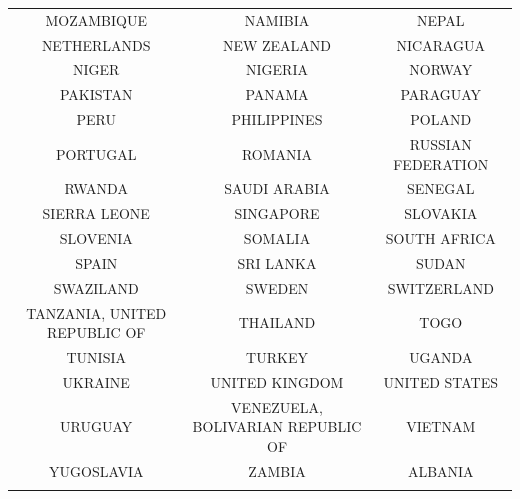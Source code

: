 \documentclass[12pt,a4paper]{article}\usepackage[]{graphicx}\usepackage[]{color}
\begin{document}
{\begin{table}[!htbp]
\begin{tabular}{@{\extracolsep{5pt}} ccc}
MOZAMBIQUE & NAMIBIA & NEPAL \\ 
NETHERLANDS & NEW ZEALAND & NICARAGUA \\ 
NIGER & NIGERIA & NORWAY \\ 
PAKISTAN & PANAMA & PARAGUAY \\ 
PERU & PHILIPPINES & POLAND \\ 
PORTUGAL & ROMANIA & RUSSIAN FEDERATION \\ 
RWANDA & SAUDI ARABIA & SENEGAL \\ 
SIERRA LEONE & SINGAPORE & SLOVAKIA \\ 
SLOVENIA & SOMALIA & SOUTH AFRICA \\ 
SPAIN & SRI LANKA & SUDAN \\ 
SWAZILAND & SWEDEN & SWITZERLAND \\ 
TANZANIA, UNITED REPUBLIC OF & THAILAND & TOGO \\ 
TUNISIA & TURKEY & UGANDA \\ 
UKRAINE & UNITED KINGDOM & UNITED STATES \\ 
URUGUAY & VENEZUELA, BOLIVARIAN REPUBLIC OF & VIETNAM \\ 
YUGOSLAVIA & ZAMBIA & ALBANIA \\ 
\hline \\[-1.8ex] 
\end{tabular} 
\end{table} 

\clearpage
}
\end{document}
